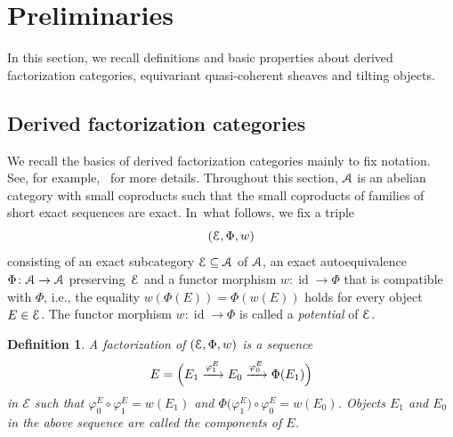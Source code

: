 \documentclass[pdftex]{sigma}%
\newtheorem{dfn}{Definition}[section]
\numberwithin{equation}{section}
\newcommand{\id}{\operatorname{id}}
\newcommand{\scrA}{\EuScript{A}}
\newcommand{\scrE}{\EuScript{E}}
\begin{document}
\section{Preliminaries}%
In this section, we recall definitions and basic properties about derived factorization categories, equivariant quasi-coherent sheaves and tilting objects.

\subsection{Derived factorization categories}%
We recall the basics of derived factorization categories mainly to fix notation. See, for example,~\cite{bdfik,H1,posi} for more details.
Throughout this section, $\scrA$ is an abelian category with small coproducts such that the small coproducts of families of short exact sequences are exact. In~what follows, we fix a triple
\begin{equation}\label{triple}
(\scrE,\Phi,w)
\end{equation}
consisting of an exact subcategory $\scrE\subseteq\scrA$ of $\scrA$, an exact autoequivalence $\Phi\colon \scrA\to \scrA$ pre\-ser\-ving~$\scrE$ and a functor morphism $w\colon \id\to\Phi$ that is compatible with $\Phi$, i.e., the equality $w({\Phi(E)})=\Phi(w(E))$ holds for every object $E\in\scrE$. The functor morphism $w\colon \id\to\Phi$ is called a {\it potential} of $\scrE$.

\begin{dfn} A {\it factorization} of $(\scrE,\Phi,w)$ is a sequence
\begin{gather*}
E=\Bigl(E_1\xrightarrow{\varphi^E_1}E_0\xrightarrow{\varphi^E_0}\Phi(E_1)\Bigr)
\end{gather*}
in $\mathcal{E}$ such that $\varphi^E_0\circ\varphi^E_1=w(E_1)$ and $\Phi\big(\varphi^E_1\big)\circ\varphi^E_0=w(E_0)$. Objects $E_1$ and $E_0$ in the above sequence are called the {\it components} of $E$. \end{dfn}
\end{document}
